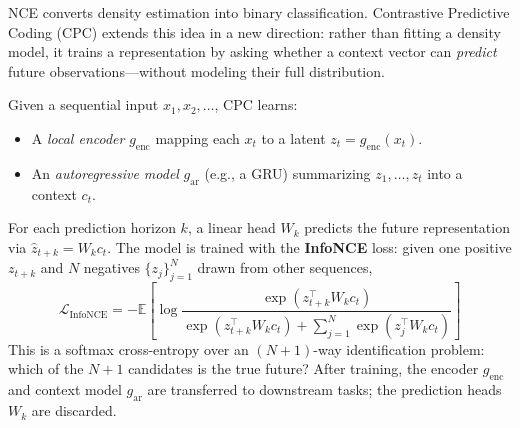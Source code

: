 \documentclass[11pt, letterpaper]{article}
\begin{document}
NCE converts density estimation into binary classification. Contrastive Predictive Coding (CPC) extends this idea in a new direction: rather than fitting a density model, it trains a representation by asking whether a context vector can \textit{predict} future observations---without modeling their full distribution.

\begin{concept}
    Given a sequential input \(x_1, x_2, \dots\), CPC learns:
    \begin{itemize}
        \item A \textit{local encoder} \(g_{\text{enc}}\) mapping each \(x_t\) to a latent \(z_t = g_{\text{enc}}(x_t)\).
        \item An \textit{autoregressive model} \(g_{\text{ar}}\) (e.g., a GRU) summarizing \(z_1, \dots, z_t\) into a context \(c_t\).
    \end{itemize}
    For each prediction horizon \(k\), a linear head \(W_k\) predicts the future representation via \(\hat{z}_{t+k} = W_k c_t\). The model is trained with the \textbf{InfoNCE} loss: given one positive \(z_{t+k}\) and \(N\) negatives \(\{z_j\}_{j=1}^N\) drawn from other sequences,
    \[
        \mathcal{L}_{\text{InfoNCE}} = -\mathbb{E}\left[\log \frac{\exp(z_{t+k}^\top W_k c_t)}{\exp(z_{t+k}^\top W_k c_t) + \sum_{j=1}^N \exp(z_j^\top W_k c_t)}\right]
    \]
    This is a softmax cross-entropy over an \((N+1)\)-way identification problem: which of the \(N+1\) candidates is the true future? After training, the encoder \(g_{\text{enc}}\) and context model \(g_{\text{ar}}\) are transferred to downstream tasks; the prediction heads \(W_k\) are discarded.
\end{concept}
\end{document}
